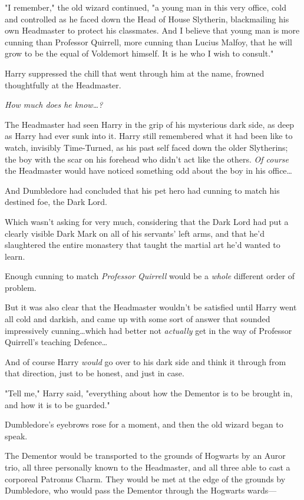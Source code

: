 "I remember," the old wizard continued, "a young man in this very office, cold
and controlled as he faced down the Head of House Slytherin, blackmailing his
own Headmaster to protect his classmates. And I believe that young man is more
cunning than Professor Quirrell, more cunning than Lucius Malfoy, that he will
grow to be the equal of Voldemort himself. It is he who I wish to consult."

Harry suppressed the chill that went through him at the name, frowned
thoughtfully at the Headmaster.

\emph{How much does he know…?}

The Headmaster had seen Harry in the grip of his mysterious dark side, as deep
as Harry had ever sunk into it. Harry still remembered what it had been like to
watch, invisibly Time-Turned, as his past self faced down the older Slytherins;
the boy with the scar on his forehead who didn’t act like the others. \emph{Of
course} the Headmaster would have noticed something odd about the boy in his
office…

And Dumbledore had concluded that his pet hero had cunning to match his
destined foe, the Dark Lord.

Which wasn’t asking for very much, considering that the Dark Lord had put a
clearly visible Dark Mark on all of his servants’ left arms, and that he’d
slaughtered the entire monastery that taught the martial art he’d wanted to
learn.

Enough cunning to match \emph{Professor Quirrell} would be a \emph{whole}
different order of problem.

But it was also clear that the Headmaster wouldn’t be satisfied until Harry
went all cold and darkish, and came up with some sort of answer that sounded
impressively cunning…which had better not \emph{actually} get in the
way of Professor Quirrell’s teaching Defence…

And of course Harry \emph{would} go over to his dark side and think it through
from that direction, just to be honest, and just in case.

"Tell me," Harry said, "everything about how the Dementor is to be brought in,
and how it is to be guarded."

Dumbledore’s eyebrows rose for a moment, and then the old wizard began to speak.

The Dementor would be transported to the grounds of Hogwarts by an Auror trio,
all three personally known to the Headmaster, and all three able to cast a
corporeal Patronus Charm. They would be met at the edge of the grounds by
Dumbledore, who would pass the Dementor through the Hogwarts wards—

